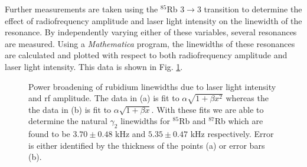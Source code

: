 Further measurements are taken using the $^{85}$Rb $3\rightarrow3$ transition to determine the effect of radiofrequency amplitude and laser light intensity on the linewidth of the resonance. By independently varying either of these variables, several resonances are measured.  Using a \emph{Mathematica} program, the linewidths of these resonances are calculated and plotted with respect to both radiofrequency amplitude and laser light intensity.  This data is shown in Fig. \ref{fig:linewidths}.
\begin{figure}[h!]
\begin{center}
\hspace{-1mm}
\vspace{-2mm}
\vspace{-2mm}
\caption{\small{Power broadening of rubidium linewidths due to laser light intensity and rf amplitude.  The data in (a) is fit to $\alpha \sqrt{1+\beta x^2}$ whereas the the data in (b) is fit to $\alpha \sqrt{1+\beta x}$.  With these fits we are able to determine the natural $\gamma_2$ linewidths for $^{85}$Rb and $^{87}$Rb which are found to be $3.70 \pm 0.48$ kHz and $5.35 \pm 0.47$ kHz respectively.  Error is either identified by the thickness of the points (a) or error bars (b).}}\label{fig:linewidths}
\end{center}
\end{figure}

